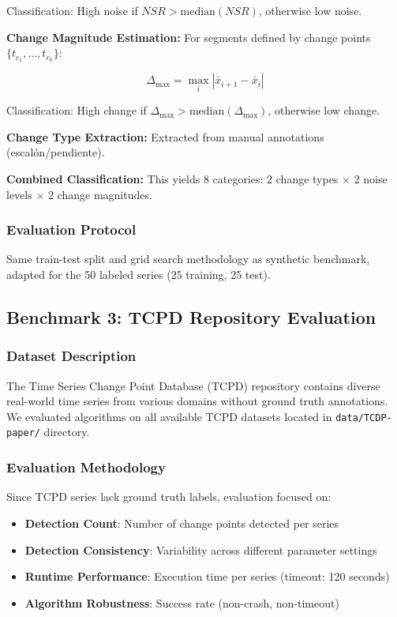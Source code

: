 \documentclass[journal,article,submit,pdftex,moreauthors]{Definitions/mdpi}
\begin{document}
Classification: High noise if $NSR > \text{median}(NSR)$, otherwise low noise.

\textbf{Change Magnitude Estimation:}
For segments defined by change points $\{t_{c_1}, \ldots, t_{c_k}\}$:
\begin{linenomath}
\begin{equation}
\Delta_{\max} = \max_{i} |\bar{x}_{i+1} - \bar{x}_i|
\end{equation}
\end{linenomath}

Classification: High change if $\Delta_{\max} > \text{median}(\Delta_{\max})$, otherwise low change.

\textbf{Change Type Extraction:} Extracted from manual annotations (escalón/pendiente).

\textbf{Combined Classification:} This yields 8 categories: 2 change types $\times$ 2 noise levels $\times$ 2 change magnitudes.

\subsubsection{Evaluation Protocol}

Same train-test split and grid search methodology as synthetic benchmark, adapted for the 50 labeled series (25 training, 25 test).

\subsection{Benchmark 3: TCPD Repository Evaluation}

\subsubsection{Dataset Description}

The Time Series Change Point Database (TCPD) repository contains diverse real-world time series from various domains without ground truth annotations. We evaluated algorithms on all available TCPD datasets located in \texttt{data/TCDP-paper/} directory.

\subsubsection{Evaluation Methodology}

Since TCPD series lack ground truth labels, evaluation focused on:
\begin{itemize}
    \item \textbf{Detection Count}: Number of change points detected per series
    \item \textbf{Detection Consistency}: Variability across different parameter settings
    \item \textbf{Runtime Performance}: Execution time per series (timeout: 120 seconds)
    \item \textbf{Algorithm Robustness}: Success rate (non-crash, non-timeout)
\end{itemize}
\end{document}
